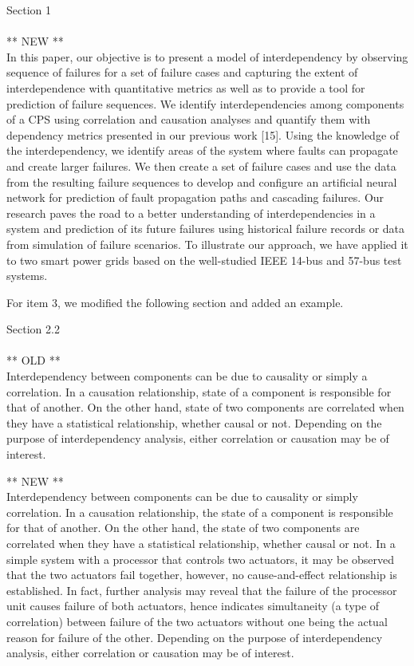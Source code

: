 \documentclass{article}
\newenvironment{response}{
  \doublespacing
  \setlength\parindent{0.05\linewidth}
  \ttfamily
}{}
\newenvironment{textblock}[1]
{\begin{tcolorbox}[breakable,enhanced]{#1 \\ \\}}
{\end{tcolorbox}}
\begin{document}
\begin{response}
\begin{textblock}{Section 1}
\vspace{1em}
** NEW **\\
In this paper, our objective is to present a model of interdependency by observing sequence of failures for a set of failure cases and capturing the extent of interdependence with quantitative metrics as well as to provide a tool for prediction of failure sequences. We identify interdependencies among components of a CPS using correlation and causation analyses and quantify them with dependency metrics presented in our previous work [15]. Using the knowledge of the interdependency, we identify areas of the system where faults can propagate and create larger failures. We then create a set of failure cases and use the data from the resulting failure sequences to develop and configure an artificial neural network for prediction of fault propagation paths and cascading failures. Our research paves the road to a better understanding of interdependencies in a system and prediction of its future failures using historical failure records or data from simulation of failure scenarios. To illustrate our approach, we have applied it to two smart power grids based on the well-studied IEEE 14-bus and 57-bus test systems.
\end{textblock}

For item 3, we modified the following section and added an example.

\begin{textblock}{Section 2.2}
** OLD **\\
Interdependency between components can be due to causality or simply a correlation. In a causation relationship, state of a component is responsible for that of another. On the other hand, state of two components are correlated when they have a statistical relationship, whether causal or not. Depending on the purpose of interdependency analysis, either correlation or causation may be of interest.

\vspace{1em}
** NEW **\\
Interdependency between components can be due to causality or simply correlation. In a causation relationship, the state of a component is responsible for that of another. On the other hand, the state of two components are correlated when they have a statistical relationship, whether causal or not. In a simple system with a processor that controls two actuators, it may be observed that the two actuators fail together, however, no cause-and-effect relationship is established. In fact, further analysis may reveal that the failure of the processor unit causes failure of both actuators, hence indicates simultaneity (a type of correlation) between failure of the two actuators without one being the actual reason for failure of the other. Depending on the purpose of interdependency analysis, either correlation or causation may be of interest.
\end{textblock}


\end{response}
\end{document}
